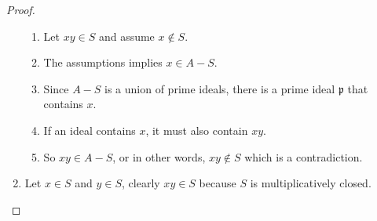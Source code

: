 \documentclass{book}
\theoremstyle{plain}
\theoremstyle{definition}
\theoremstyle{custom_definition}
\begin{document}
\begin{proof}
\begin{enumerate}
        \begin{enumerate}
            \item Let \(xy \in S\) and assume \(x \not\in S\).
            \item The assumptions implies \(x \in A - S\).
            \item Since \(A - S\) is a union of prime ideals, there is a prime ideal \(\mathfrak{p}\) that contains \(x\).
            \item If an ideal contains \(x\), it must also contain \(xy\).
            \item So \(xy \in A - S\), or in other words, \(xy \not\in S\) which is a contradiction.
        \end{enumerate}
        \item Let \(x \in S\) and \(y \in S\), clearly \(xy \in S\) because \(S\) is multiplicatively closed.
    \end{enumerate}
\end{proof}
\end{document}
